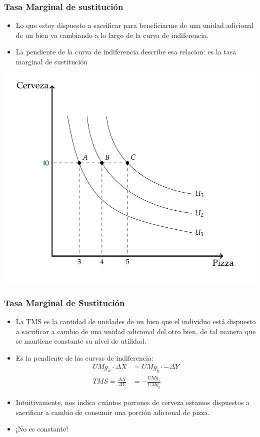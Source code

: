 \documentclass{beamer}
\begin{document}
\begin{frame}
\frametitle{Tasa Marginal de sustitución}
\begin{itemize}
    \item Lo que estoy dispuesto a sacrificar para beneficiarme de una unidad adicional de un bien va cambiando a lo largo de la curva de indiferencia.
    \item La pendiente de la curva de indiferencia describe esa relacion: es la tasa marginal de sustitución
\end{itemize} 
\centering
\includegraphics[scale=0.5]{../Figures/C7.9.png}
\end{frame}

\begin{frame}
\frametitle{Tasa Marginal de Sustitución}
\begin{itemize}
    \item La TMS es la cantidad de unidades de un bien que el individuo está dispuesto a sacrificar a cambio de una unidad adicional del otro bien, de tal manera que se mantiene constante su nivel de utilidad.
    \item Es la pendiente de las curvas de indiferencia:
    \begin{align*}
        UMg_x \cdot \Delta X &= UMg_y \cdot - \Delta Y \\
        TMS = \frac{\Delta X}{\Delta Y} &= - \frac{UMg_x}{UMg_y}
    \end{align*}    
    \item Intuitivamente, nos indica cuántos porrones de cerveza estamos dispuestos a sacrificar a cambio de consumir una porción adicional de pizza.
    \item ¡No es constante!
\end{itemize} 
\end{frame}
\end{document}
